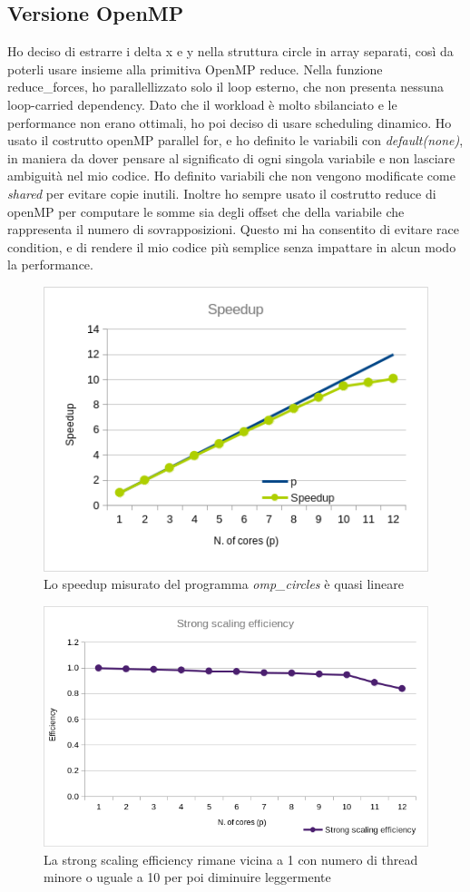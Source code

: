 \documentclass[a4paper,11pt, twoside]{report}
\begin{document}
\subsection*{Versione OpenMP}
Ho deciso di estrarre i delta x e y nella struttura circle in array separati, così da poterli usare insieme alla primitiva OpenMP reduce.
Nella funzione reduce\_forces, ho parallellizzato solo il loop esterno, che non presenta nessuna loop-carried dependency.
Dato che il workload è molto sbilanciato e le performance non erano ottimali, ho poi deciso di usare scheduling dinamico.
Ho usato il costrutto openMP parallel for, e ho definito le variabili con \textit{default(none)}, in maniera da dover pensare al significato di ogni singola variabile e non lasciare ambiguità nel mio codice.
Ho definito variabili che non vengono modificate come \textit{shared} per evitare copie inutili.
Inoltre ho sempre usato il costrutto reduce di openMP per computare le somme sia degli offset che della variabile che rappresenta il numero di sovrapposizioni.
Questo mi ha consentito di evitare race condition, e di rendere il mio codice più semplice senza impattare in alcun modo la performance.
\begin{figure}
    \includegraphics[scale=0.5]{images/omp_speedup.png}
    \caption[]{Lo speedup misurato del programma \textit{omp\_circles} è quasi lineare}
\end{figure}
\begin{figure}
    \includegraphics[scale=0.5]{images/omp_strong.png}
    \caption[]{La strong scaling efficiency rimane vicina a 1 con numero di thread minore o uguale a 10 per poi diminuire leggermente}
\end{figure}
\end{document}
